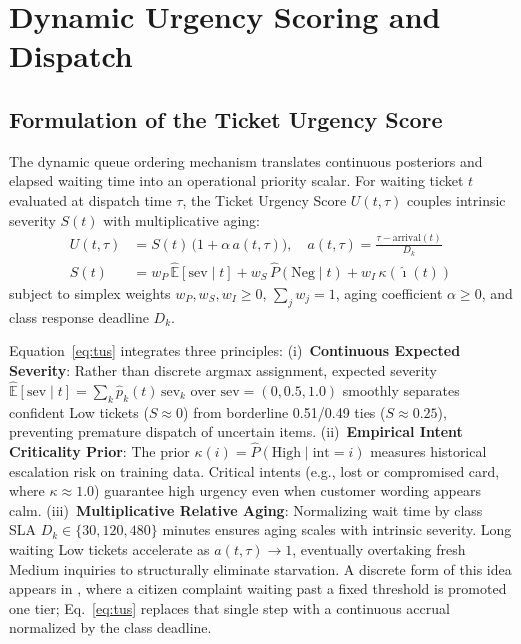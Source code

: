 \section{Dynamic Urgency Scoring and Dispatch}
\label{sec:score}

\subsection{Formulation of the Ticket Urgency Score}

The dynamic queue ordering mechanism translates continuous posteriors and elapsed waiting time into an operational priority scalar. For waiting ticket $t$ evaluated at dispatch time $\tau$, the Ticket Urgency Score $U(t, \tau)$ couples intrinsic severity $S(t)$ with multiplicative aging:
\begin{align}
U(t,\tau) &= S(t)\,\bigl(1 + \alpha\, a(t,\tau)\bigr), \quad a(t,\tau) = \frac{\tau - \mathrm{arrival}(t)}{D_k} \label{eq:tus}\\
S(t) &= w_P\,\hat{\mathbb{E}}[\mathrm{sev}\mid t] + w_S\,\hat{P}(\mathrm{Neg}\mid t) + w_I\,\kappa(\hat{\imath}(t)) \label{eq:severity}
\end{align}
subject to simplex weights $w_P, w_S, w_I \ge 0$, $\sum_j w_j = 1$, aging coefficient $\alpha \ge 0$, and class response deadline $D_k$.

Equation~\eqref{eq:tus} integrates three principles:
(i)~\textbf{Continuous Expected Severity}: Rather than discrete argmax assignment, expected severity $\hat{\mathbb{E}}[\mathrm{sev}\mid t] = \sum_k \hat{p}_k(t)\,\mathrm{sev}_k$ over $\mathrm{sev} = (0, 0.5, 1.0)$ smoothly separates confident Low tickets ($S \approx 0$) from borderline 0.51/0.49 ties ($S \approx 0.25$), preventing premature dispatch of uncertain items.
(ii)~\textbf{Empirical Intent Criticality Prior}: The prior $\kappa(i) = \hat{P}(\mathrm{High}\mid \mathrm{int}=i)$ measures historical escalation risk on training data. Critical intents (e.g., lost or compromised card, where $\kappa \approx 1.0$) guarantee high urgency even when customer wording appears calm.
(iii)~\textbf{Multiplicative Relative Aging}: Normalizing wait time by class SLA $D_k \in \{30, 120, 480\}$ minutes ensures aging scales with intrinsic severity. Long waiting Low tickets accelerate as $a(t, \tau) \to 1$, eventually overtaking fresh Medium inquiries to structurally eliminate starvation. A discrete form of this idea appears in \cite{deshmukh2020priority}, where a citizen complaint waiting past a fixed threshold is promoted one tier; Eq.~\eqref{eq:tus} replaces that single step with a continuous accrual normalized by the class deadline.


